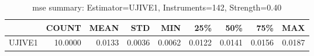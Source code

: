 \begin{table}[ht]
\centering
\caption{mse summary: Estimator=UJIVE1, Instruments=142, Strength=0.40}
\begin{tabular}{lrrrrrrrr}
\toprule
 & COUNT & MEAN & STD & MIN & 25\% & 50\% & 75\% & MAX \\
\midrule
UJIVE1 & 10.0000 & 0.0133 & 0.0036 & 0.0062 & 0.0122 & 0.0141 & 0.0156 & 0.0187 \\
\bottomrule
\end{tabular}
\end{table}
